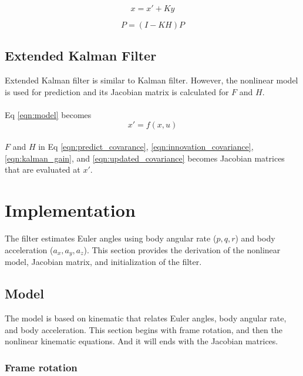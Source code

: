 \documentclass[]{article}
\begin{document}
\begin{equation}
x = x' + Ky\label{eqn:updated_states}
\end{equation}

\begin{equation}
P = (I-KH)P\label{eqn:updated_covariance}
\end{equation}

\subsection{Extended Kalman Filter}
Extended Kalman filter is similar to Kalman filter. However, the nonlinear model is used for prediction and its Jacobian matrix is calculated for $F$ and $H$.

\paragraph*{}
Eq \eqref{eqn:model} becomes
\begin{equation}
x' = f(x, u)
\end{equation}

\paragraph*{}
$F$ and $H$ in Eq \eqref{eqn:predict_covarance}, \eqref{eqn:innovation_covariance}, \eqref{eqn:kalman_gain}, and \eqref{eqn:updated_covariance} becomes Jacobian matrices that are evaluated at $x'$.

\section{Implementation}
The filter estimates Euler angles using body angular rate ($p, q, r$) and body acceleration ($a_x, a_y, a_z$). This section provides the derivation of the nonlinear model, Jacobian matrix, and initialization of the filter.

\subsection{Model}
The model is based on kinematic that relates Euler angles, body angular rate, and body acceleration. This section begins with frame rotation, and then the nonlinear kinematic equations. And it will ends with the Jacobian matrices. 

\subsubsection{Frame rotation}
\end{document}
